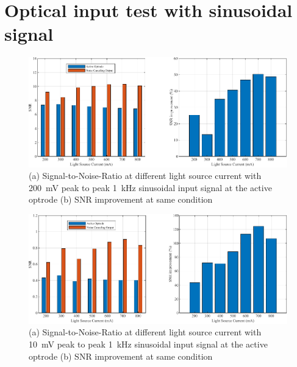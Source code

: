 \section{Optical input test with sinusoidal signal}

\begin{figure}[H]
\centerline{\includegraphics[width=1\linewidth]{5-Experiment/SNR (200mV input).pdf}}
\caption{(a) Signal-to-Noise-Ratio at different light source current with \qty{200}{\mV} peak to peak \qty{1}{\kHz} sinusoidal input signal at the active optrode (b) SNR improvement at same condition}
\label{fig_SNR (200mV input)}
\end{figure}

\begin{figure}[H]
\centerline{\includegraphics[width=1\linewidth]{5-Experiment/SNR (10mV input).pdf}}
\caption{(a) Signal-to-Noise-Ratio at different light source current with \qty{10}{\mV} peak to peak \qty{1}{\kHz} sinusoidal input signal at the active optrode (b) SNR improvement at same condition}
\label{fig_SNR (10mV input)}
\end{figure}

